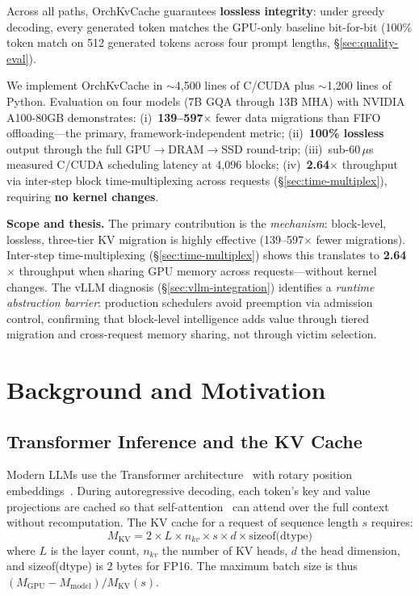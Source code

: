 \documentclass[conference]{IEEEtran}
\begin{document}
Across all paths, OrchKvCache guarantees \textbf{lossless integrity}: under greedy decoding, every generated token matches the GPU-only baseline bit-for-bit (100\% token match on 512 generated tokens across four prompt lengths, \S\ref{sec:quality-eval}).

We implement OrchKvCache in ${\sim}$4,500 lines of C/CUDA plus ${\sim}$1,200 lines of Python. Evaluation on four models (7B GQA through 13B MHA) with NVIDIA A100-80GB demonstrates: (i)~\textbf{139--597$\times$} fewer data migrations than FIFO offloading---the primary, framework-independent metric; (ii)~\textbf{100\% lossless} output through the full GPU$\to$DRAM$\to$SSD round-trip; (iii)~sub-60\,$\mu$s measured C/CUDA scheduling latency at 4,096 blocks; (iv)~\textbf{2.64$\times$} throughput via inter-step block time-multiplexing across requests (\S\ref{sec:time-multiplex}), requiring \textbf{no kernel changes}.

\textbf{Scope and thesis.} The primary contribution is the \emph{mechanism}: block-level, lossless, three-tier KV migration is highly effective (139--597$\times$ fewer migrations). Inter-step time-multiplexing (\S\ref{sec:time-multiplex}) shows this translates to \textbf{2.64$\times$} throughput when sharing GPU memory across requests---without kernel changes. The vLLM diagnosis (\S\ref{sec:vllm-integration}) identifies a \emph{runtime abstraction barrier}: production schedulers avoid preemption via admission control, confirming that block-level intelligence adds value through tiered migration and cross-request memory sharing, not through victim selection.

\section{Background and Motivation}
\subsection{Transformer Inference and the KV Cache}

Modern LLMs use the Transformer architecture~\cite{transformer} with rotary position embeddings~\cite{rope}. During autoregressive decoding, each token's key and value projections are cached so that self-attention~\cite{transformer} can attend over the full context without recomputation. The KV cache for a request of sequence length $s$ requires:
\begin{equation}
M_{\text{KV}} = 2 \times L \times n_{kv} \times s \times d \times \text{sizeof(dtype)}
\label{eq:kv-mem}
\end{equation}
where $L$ is the layer count, $n_{kv}$ the number of KV heads, $d$ the head dimension, and sizeof(dtype) is 2 bytes for FP16. The maximum batch size is thus $(M_{\text{GPU}} - M_{\text{model}}) / M_{\text{KV}}(s)$.
\end{document}
